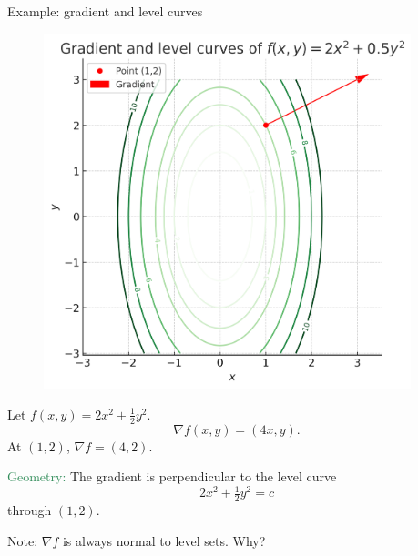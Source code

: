 \documentclass[11pt,aspectratio=169]{beamer}
\begin{document}
\begin{frame}{Example: gradient and level curves}
\begin{minipage}{6cm}
	\begin{figure}
\includegraphics[width=0.95\textwidth]{img/gradient_level_sets}
\end{figure}
\end{minipage}\begin{minipage}{9cm}
	Let $f(x,y)=2x^2+\tfrac12 y^2$.
\[
\nabla f(x,y) = (4x,y).
\]
At $(1,2)$, $\nabla f=(4,2)$.

\vskip 6pt
\textcolor{SeaGreen}{Geometry:}  
The gradient is perpendicular to the level curve 
\[
2x^2+\tfrac12 y^2=c
\]
through $(1,2)$.
\end{minipage}
Note: {$\nabla f$ is always normal to level sets. Why?}

\end{frame}
\end{document}
